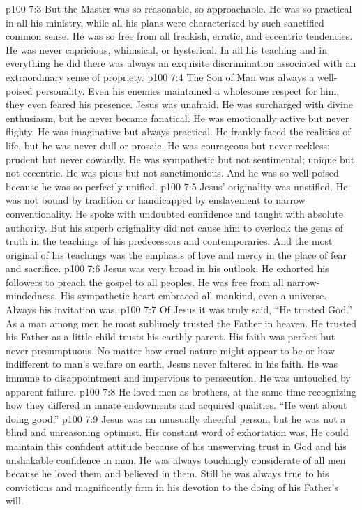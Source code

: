 \vs p100 7:3 But the Master was so reasonable, so approachable. He was so practical in all his ministry, while all his plans were characterized by such sanctified common sense. He was so free from all freakish, erratic, and eccentric tendencies. He was never capricious, whimsical, or hysterical. In all his teaching and in everything he did there was always an exquisite discrimination associated with an extraordinary sense of propriety.
\vs p100 7:4 The Son of Man was always a well\hyp{}poised personality. Even his enemies maintained a wholesome respect for him; they even feared his presence. Jesus was unafraid. He was surcharged with divine enthusiasm, but he never became fanatical. He was emotionally active but never flighty. He was imaginative but always practical. He frankly faced the realities of life, but he was never dull or prosaic. He was courageous but never reckless; prudent but never cowardly. He was sympathetic but not sentimental; unique but not eccentric. He was pious but not sanctimonious. And he was so well\hyp{}poised because he was so perfectly unified.
\vs p100 7:5 Jesus’ originality was unstifled. He was not bound by tradition or handicapped by enslavement to narrow conventionality. He spoke with undoubted confidence and taught with absolute authority. But his superb originality did not cause him to overlook the gems of truth in the teachings of his predecessors and contemporaries. And the most original of his teachings was the emphasis of love and mercy in the place of fear and sacrifice.
\vs p100 7:6 Jesus was very broad in his outlook. He exhorted his followers to preach the gospel to all peoples. He was free from all narrow\hyp{}mindedness. His sympathetic heart embraced all mankind, even a universe. Always his invitation was, 
\vs p100 7:7 Of Jesus it was truly said, “He trusted God.” As a man among men he most sublimely trusted the Father in heaven. He trusted his Father as a little child trusts his earthly parent. His faith was perfect but never presumptuous. No matter how cruel nature might appear to be or how indifferent to man’s welfare on earth, Jesus never faltered in his faith. He was immune to disappointment and impervious to persecution. He was untouched by apparent failure.
\vs p100 7:8 He loved men as brothers, at the same time recognizing how they differed in innate endowments and acquired qualities. “He went about doing good.”
\vs p100 7:9 Jesus was an unusually cheerful person, but he was not a blind and unreasoning optimist. His constant word of exhortation was,  He could maintain this confident attitude because of his unswerving trust in God and his unshakable confidence in man. He was always touchingly considerate of all men because he loved them and believed in them. Still he was always true to his convictions and magnificently firm in his devotion to the doing of his Father’s will.
